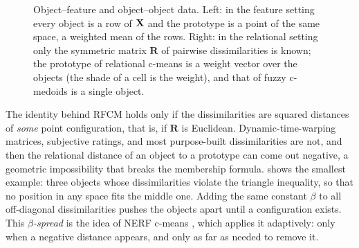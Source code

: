 \begin{figure}[htbp]
\caption[Object--feature and object--object data.]{Object--feature and object--object data. Left: in the feature setting every object is a row of $\mathbf{X}$ and the prototype is a point of the same space, a weighted mean of the rows. Right: in the relational setting only the symmetric matrix $\mathbf{R}$ of pairwise dissimilarities is known; the prototype of relational c-means is a weight vector over the objects (the shade of a cell is the weight), and that of fuzzy c-medoids is a single object.}
\label{fig:rel:layouts}
\end{figure}

The identity behind RFCM holds only if the dissimilarities are squared distances of \emph{some} point configuration, that is, if $\mathbf{R}$ is Euclidean. Dynamic-time-warping matrices, subjective ratings, and most purpose-built dissimilarities are not, and then the relational distance of an object to a prototype can come out negative, a geometric impossibility that breaks the membership formula.  shows the smallest example: three objects whose dissimilarities violate the triangle inequality, so that no position in any space fits the middle one. Adding the same constant $\beta$ to all off-diagonal dissimilarities pushes the objects apart until a configuration exists. This \emph{$\beta$-spread} is the idea of NERF c-means \cite{hathaway:1994:nerf}, which applies it adaptively: only when a negative distance appears, and only as far as needed to remove it.

